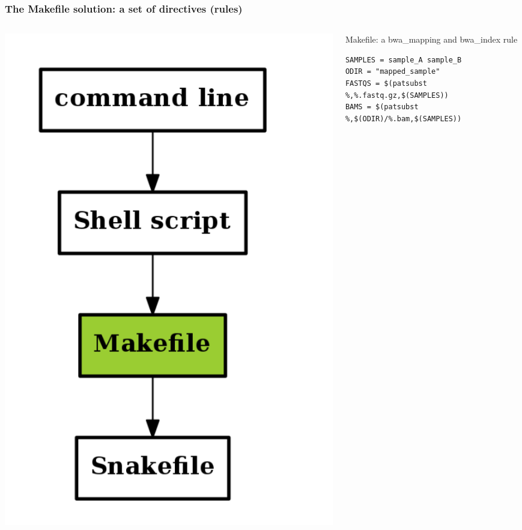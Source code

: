 \documentclass{beamer}
\begin{document}

\begin{frame}[fragile]
    \frametitle{The Makefile solution: a set of directives (rules)}
    
    \begin{columns}
 \begin{column}[T]{3cm}
 \includegraphics[width=1\textwidth, height=0.6\textheight]{images/flow_methods_3.png}
 \end{column}
  \begin{column}[T]{9cm}  
  
    \begin{block}{Makefile: a bwa\_mapping and bwa\_index rule}
    \small
    \begin{lstlisting}
SAMPLES = sample_A sample_B
ODIR = "mapped_sample"
FASTQS = $(patsubst %,%.fastq.gz,$(SAMPLES))
BAMS = $(patsubst %,$(ODIR)/%.bam,$(SAMPLES))


\end{lstlisting}
\end{block}
\end{column}
\end{columns}
\end{frame}
\end{document}
